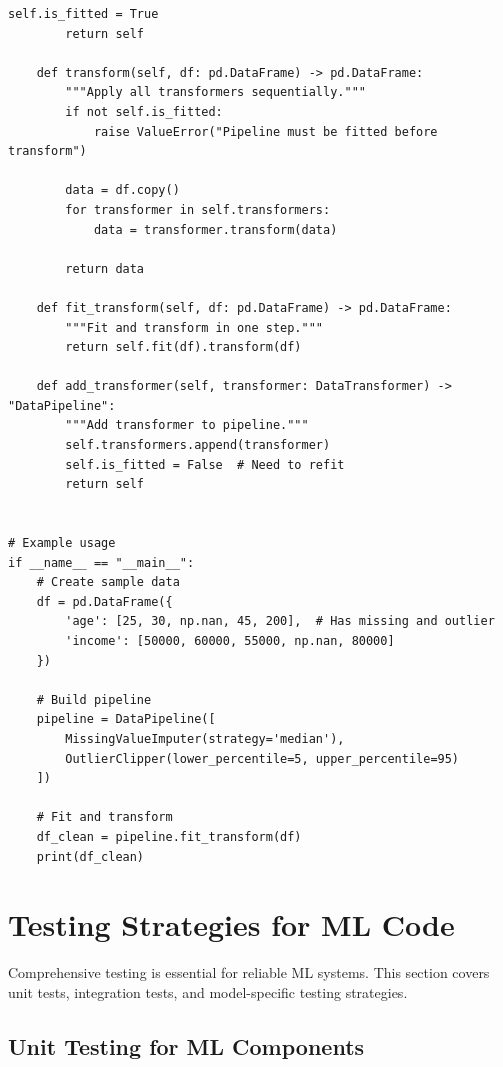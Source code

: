 \begin{lstlisting}[style=python, caption=Modular data processing pipeline]
        self.is_fitted = True
        return self

    def transform(self, df: pd.DataFrame) -> pd.DataFrame:
        """Apply all transformers sequentially."""
        if not self.is_fitted:
            raise ValueError("Pipeline must be fitted before transform")

        data = df.copy()
        for transformer in self.transformers:
            data = transformer.transform(data)

        return data

    def fit_transform(self, df: pd.DataFrame) -> pd.DataFrame:
        """Fit and transform in one step."""
        return self.fit(df).transform(df)

    def add_transformer(self, transformer: DataTransformer) -> "DataPipeline":
        """Add transformer to pipeline."""
        self.transformers.append(transformer)
        self.is_fitted = False  # Need to refit
        return self


# Example usage
if __name__ == "__main__":
    # Create sample data
    df = pd.DataFrame({
        'age': [25, 30, np.nan, 45, 200],  # Has missing and outlier
        'income': [50000, 60000, 55000, np.nan, 80000]
    })

    # Build pipeline
    pipeline = DataPipeline([
        MissingValueImputer(strategy='median'),
        OutlierClipper(lower_percentile=5, upper_percentile=95)
    ])

    # Fit and transform
    df_clean = pipeline.fit_transform(df)
    print(df_clean)
\end{lstlisting}

\section{Testing Strategies for ML Code}

Comprehensive testing is essential for reliable ML systems. This section covers unit tests, integration tests, and model-specific testing strategies.

\subsection{Unit Testing for ML Components}

